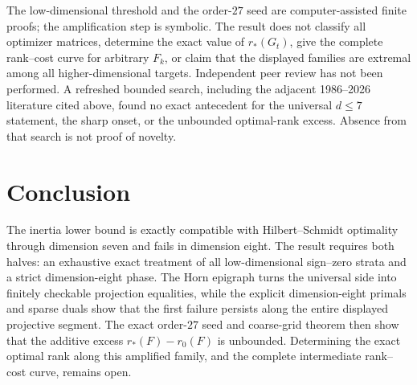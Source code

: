 \documentclass[11pt]{article}
\begin{document}
The low-dimensional threshold and the order-$27$ seed are computer-assisted
finite proofs; the amplification step is symbolic.  The result does not
classify all optimizer matrices, determine the exact value of $r_*(G_t)$,
give the complete rank--cost curve for arbitrary $F_k$, or claim that the
displayed families are extremal among all higher-dimensional targets.
Independent peer review has not been performed.  A refreshed bounded search,
including the adjacent 1986--2026 literature cited above, found no exact
antecedent for the universal $d\le7$ statement, the sharp onset, or the
unbounded optimal-rank excess.  Absence from that search is not proof of
novelty.

\section{Conclusion}

The inertia lower bound is exactly compatible with Hilbert--Schmidt
optimality through dimension seven and fails in dimension eight.  The result
requires both halves: an exhaustive exact treatment of all low-dimensional
sign--zero strata and a strict dimension-eight phase.  The Horn epigraph
turns the universal side into finitely checkable projection equalities, while
the explicit dimension-eight primals and sparse duals show that the first
failure persists along the entire displayed projective segment.  The exact
order-$27$ seed and coarse-grid theorem then show that the additive excess
$r_*(F)-r_0(F)$ is unbounded.  Determining the exact optimal rank along this
amplified family, and the complete intermediate rank--cost curve, remains
open.


\begingroup
\footnotesize
\raggedright

\endgroup
\end{document}
